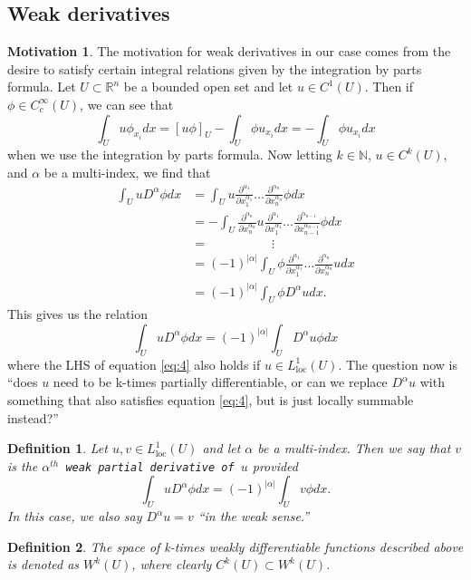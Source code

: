 \documentclass[11pt]{article}
\newtheorem{definition}{Definition}
\theoremstyle{definition}
\newtheorem*{motivation}{Motivation}
\begin{document}
\subsection{Weak derivatives}
\begin{motivation}
	The motivation for weak derivatives in our case comes from the desire to satisfy certain integral relations given by the integration by parts formula.
	Let $U \subset \mathbb{R}^n$ be a bounded open set and let $u\in C^1(U)$. Then if $\phi \in C_{c}^{\infty}(U)$, we can see that
	\begin{equation*}
		\int_U u\phi_{x_i}dx = [u\phi]_U - \int_U \phi u_{x_i}dx = - \int_U \phi u_{x_i}dx
	\end{equation*}
	when we use the integration by parts formula. Now letting $k\in \mathbb{N}$, $u \in C^k(U)$, and $\alpha$ be a multi-index, we find that
	\begin{equation*}
		\begin{aligned}
			\int_U u D^{\alpha}\phi dx &= \int_U u \frac{\partial^{\alpha_1}}{\partial x_1^{\alpha_1}}\dots\frac{\partial^{\alpha_n}}{\partial x_n^{\alpha_n}}\phi dx \\
						   &= - \int_U \frac{\partial^{\alpha_n}}{\partial x_n^{\alpha_n}}u \frac{\partial^{\alpha_1}}{\partial x_1^{\alpha_1}}\dots\frac{\partial^{\alpha_{n-1}}}{\partial x_{n-1}^{\alpha_{n-1}}}\phi dx \\
						   &= \quad\qquad\qquad\vdots \\ 
						   &= (-1)^{|\alpha|}\int_U \phi\frac{\partial^{\alpha_1}}{\partial x_1^{\alpha_1}}\dots\frac{\partial^{\alpha_n}}{\partial x_n^{\alpha_n}}u dx \\
						   &= (-1)^{|\alpha|}\int_U \phi D^{\alpha}u dx.
		\end{aligned}
	\end{equation*}
	This gives us the relation
	\begin{equation}
		\label{eq:4}
		\int_U u D^{\alpha}\phi dx = (-1)^{|\alpha|}\int_U D^{\alpha}u\phi  dx
	\end{equation}
	where the LHS of equation \ref{eq:4} also holds if $u\in L_{\text{loc}}^1(U)$.
	The question now is ``does $u$ need to be k-times partially differentiable, or can we replace $D^{\alpha}u$ with something that also satisfies
	equation \ref{eq:4}, but is just locally summable instead?''
\end{motivation}
\begin{definition}
	Let $u,v \in L_{\text{loc}}^1(U)$ and let $\alpha$ be a multi-index. Then we say that $v$ is the 
	\texttt{$\alpha^{th}$ weak partial derivative of $u$} provided
	\begin{equation*}
		\int_U u D^{\alpha}\phi dx = (-1)^{|\alpha|}\int_U v \phi dx.
	\end{equation*}
	In this case, we also say $D^{\alpha}u = v$ ``in the weak sense.''
\end{definition}
\begin{definition}
	The space of k-times weakly differentiable functions described above is denoted as $W^k(U)$, where clearly $C^k(U) \subset W^k(U)$.
\end{definition}
\end{document}
